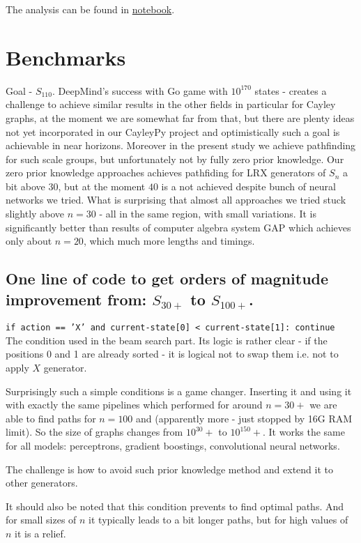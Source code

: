 \documentclass[atmp]{ipart_v1}
\numberwithin{equation}{section}
\theoremstyle{plain}%
\begin{document}
The analysis can be found in \href{https://www.kaggle.com/code/alexandervc/lrx-cayleypy-rl-mdqn}{notebook}.  

\section{Benchmarks}

Goal - $S_{110}$. DeepMind's success with Go game with $10^{170}$ states - creates a challenge to achieve similar results in the other fields in particular for Cayley graphs, at the moment we are somewhat far from that, but there are plenty ideas not yet incorporated in our CayleyPy project and optimistically such a goal is achievable in near horizons. Moreover in the present study we achieve pathfinding for such scale groups, but unfortunately not by fully zero prior knowledge. Our zero prior knowledge approaches achieves pathfiding for  LRX generators of $S_{n}$ a bit above $30$, but at the moment  $40$ is a not achieved despite  bunch of neural networks we tried. What is surprising that almost all approaches we tried stuck slightly above $n=30$ - all in the same region, with small variations. It is significantly better than results of computer algebra system GAP which achieves only about $n=20$, which much more lengths and timings. 

\subsection{One line of code to get orders of magnitude improvement from: $S_{30+}$ to $S_{100+}$. }

\texttt{if action == 'X' and current-state[0] < current-state[1]: continue }
The condition used in the beam search part. Its logic is rather clear - if the positions 0 and 1 are already sorted - it is logical not to swap them i.e. not to apply $X$ generator. 

Surprisingly such a simple conditions is a game changer. Inserting it and using it with exactly the same pipelines which performed for around $n=30+$ we  are able to find paths for $n=100$ and (apparently more - just stopped by 16G RAM limit). So the size of graphs changes from $10^30+$ to $10^150+$.  It works the same for all models: perceptrons, gradient boostings, convolutional neural networks.  

The challenge is how to avoid such prior knowledge method and extend it to other generators.

It should also be noted that this condition prevents to find optimal paths. And for small sizes of $n$ it typically leads to a bit longer paths, but for high values of $n$ it is a relief.
\end{document}
